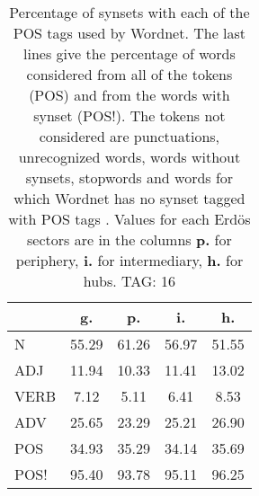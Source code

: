 \begin{table}[h!]
\begin{center}
\begin{tabular}{| l | c | c | c | c |}\hline
 & g. & p. & i. & h. \\\hline
N & 55.29  & 61.26  & 56.97  & 51.55 \\\hline
ADJ & 11.94  & 10.33  & 11.41  & 13.02 \\\hline
VERB & 7.12  & 5.11  & 6.41  & 8.53 \\\hline
ADV & 25.65  & 23.29  & 25.21  & 26.90 \\\hline
POS & 34.93  & 35.29  & 34.14  & 35.69 \\\hline
POS! & 95.40  & 93.78  & 95.11  & 96.25 \\\hline
\end{tabular}
\caption{Percentage of synsets with each of the POS tags used by Wordnet. The last lines give the percentage of words considered from all of the tokens (POS) and from the words with synset (POS!). The tokens not considered are punctuations, unrecognized words, words without synsets, stopwords and words for which Wordnet has no synset  tagged with POS tags . Values for each Erd\"os sectors are in the columns {{\bf p.}} for periphery, {{\bf i.}} for intermediary, {{\bf h.}} for hubs. TAG: 16}
\end{center}
\end{table}
